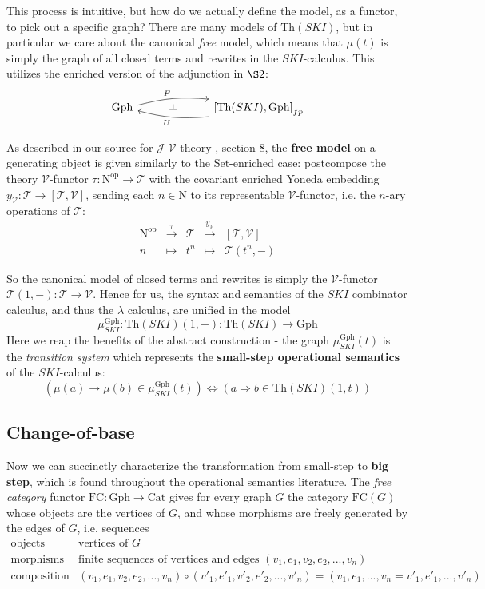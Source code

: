 \documentclass[a4paper,UKenglish]{article}
\theoremstyle{definition}
\def\ld{\rotatebox[origin=c]{-90}{$\dashv$}} %
\newcommand{\Th}{\mathrm{Th}}
\newcommand{\Gph}{\mathrm{Gph}}
\newcommand{\Set}{\mathrm{Set}}
\newcommand{\Cat}{\mathrm{Cat}}
\newcommand{\FC}{\mathrm{FC}}
\newcommand{\op}{\mathrm{op}}
\newcommand{\NN}{\mathrm{N}}
\newcommand{\V}{\mathscr{V}}
\newcommand{\J}{\mathscr{J}}
\newcommand{\T}{\mathscr{T}}
\begin{document}
This process is intuitive, but how do we actually define the model, as a functor, to pick out a specific graph? There are many models of $\Th(SKI)$, but in particular we care about the canonical \textit{free} model, which means that $\mu(t)$ is simply the graph of all closed terms and rewrites in the $SKI$-calculus. This utilizes the enriched version of the adjunction in $\S2$:
\[\begin{tikzcd}
\Gph \arrow[bend left=10,below]{rr}{F}
& \ld &
\arrow[bend left=10,above]{ll}{U} \left[\Th(SKI),\Gph\right]_{fp}
\end{tikzcd}\]

As described in our source for $\J$-$\V$ theory \cite{rbb}, section 8, the \textbf{free model} on a generating object is given similarly to the $\Set$-enriched case: postcompose the theory $\V$-functor $\tau: \NN^\op \to \T$ with the covariant enriched Yoneda embedding $y_\V: \T \to [\T,\V]$, sending each $n \in \NN$ to its representable $\V$-functor, i.e. the $n$-ary operations of $\T$:
\[\begin{array}{rllll}
	\NN^\op & \xrightarrow{\tau} & \T & \xrightarrow{y_\V} & \left[\T,\V\right]\\
	n & \mapsto & t^n & \mapsto & \T(t^n,-)
\end{array}\]

So the canonical model of closed terms and rewrites is simply the $\V$-functor $\T(1,-):\T\to \V$. Hence for us, the syntax and semantics of the $SKI$ combinator calculus, and thus the $\lambda$ calculus, are unified in the model $$\mu_{SKI}^\Gph: \Th(SKI)(1,-): \Th(SKI) \to \Gph$$
Here we reap the benefits of the abstract construction - the graph $\mu_{SKI}^\Gph(t)$ is the \textit{transition system} which represents the \textbf{small-step operational semantics} of the $SKI$-calculus: $$(\mu(a) \to \mu(b) \in \mu_{SKI}^\Gph(t)) \iff (a \Rightarrow b \in \Th(SKI)(1,t))$$

\subsection{Change-of-base}
Now we can succinctly characterize the transformation from small-step to \textbf{big step}, which is found throughout the operational semantics literature. The \textit{free category} functor $\FC: \Gph \to \Cat$ gives for every graph $G$ the category $\FC(G)$ whose objects are the vertices of $G$, and whose morphisms are freely generated by the edges of $G$, i.e. sequences 
\[\begin{array}{rl}
\text{objects} & \text{vertices of } G\\
\text{morphisms} & \text{finite sequences of vertices and edges } (v_1,e_1,v_2,e_2,...,v_n)\\
\text{composition} & (v_1,e_1,v_2,e_2,...,v_n) \circ (v'_1,e'_1,v'_2,e'_2,...,v'_n) = (v_1,e_1,...,v_n=v'_1,e'_1,...,v'_n)\\
\end{array}\]
\end{document}
